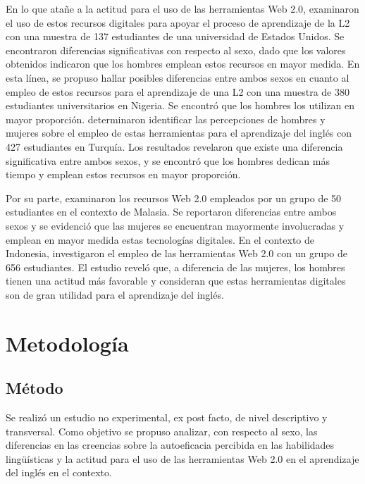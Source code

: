 \documentclass[spanish]{textolivre}
\begin{document}
En lo que atañe a la actitud para el uso de las herramientas Web 2.0, \textcite{kuznetsova_students_2019} examinaron el uso de estos recursos digitales para apoyar el proceso de aprendizaje de la L2 con una muestra de 137 estudiantes de una universidad de Estados Unidos. Se encontraron diferencias significativas con respecto al sexo, dado que los valores obtenidos indicaron que los hombres emplean estos recursos en mayor medida. En esta línea, \textcite{adibi_adoption_2019} se propuso hallar posibles diferencias entre ambos sexos en cuanto al empleo de estos recursos para el aprendizaje de una L2 con una muestra de 380 estudiantes universitarios en Nigeria. Se encontró que los hombres los utilizan en mayor proporción. \textcite{azak_analysis_2020} determinaron identificar las percepciones de hombres y mujeres sobre el empleo de estas herramientas para el aprendizaje del inglés con 427 estudiantes en Turquía. Los resultados revelaron que existe una diferencia significativa entre ambos sexos, y se encontró que los hombres dedican más tiempo y emplean estos recursos en mayor proporción.

Por su parte, \textcite{jarrah_arab_2021} examinaron los recursos Web 2.0 empleados por un grupo de 50 estudiantes en el contexto de Malasia. Se reportaron diferencias entre ambos sexos y se evidenció que las mujeres se encuentran mayormente involucradas y emplean en mayor medida estas tecnologías digitales. En el contexto de Indonesia, \textcite{ningsih_gender-based_2022} investigaron el empleo de las herramientas Web 2.0 con un grupo de 656 estudiantes. El estudio reveló que, a diferencia de las mujeres, los hombres tienen una actitud más favorable y consideran que estas herramientas digitales son de gran utilidad para el aprendizaje del inglés.

\section{Metodología}\label{sec-normas}
\subsection{Método}
Se realizó un estudio no experimental, ex post facto, de nivel descriptivo y transversal. Como objetivo se propuso analizar, con respecto al sexo, las diferencias en las creencias sobre la autoeficacia percibida en las habilidades lingüísticas y la actitud para el uso de las herramientas Web 2.0 en el aprendizaje del inglés en el contexto.
\end{document}
